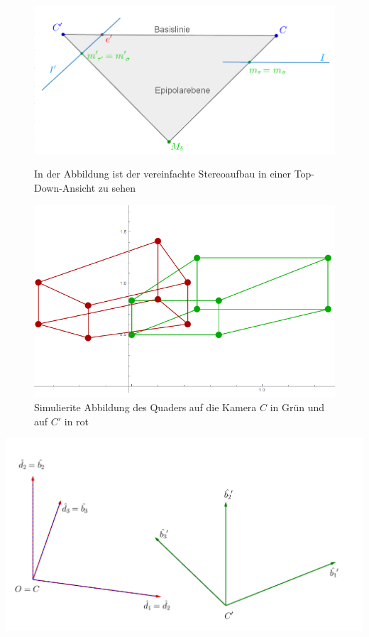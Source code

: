 \begin{figure}[!htb]
	\includegraphics[width=\linewidth]{images/SynthetischesBeispielAufbauTopDown_beschriftet.png}
	\caption[Synthetisches Beispiel Top-Down-Ansicht]{In der Abbildung ist der vereinfachte Stereoaufbau in einer Top-Down-Ansicht zu sehen}
	\label{fig:aufbauMinimalTopDown}
	\endminipage\hfill
	\includegraphics[width=\linewidth]{images/QuadrateMinimalBeispiel.png}
	\caption[Simulierte Abbildung eines Quaders auf zwei Kameras]{Simulierite Abbildung des Quaders auf die Kamera $C$ in Grün und auf $C'$ in rot}
	\label{fig:AbbildungenMinimal}
	\endminipage\hfill
\end{figure}

\begin{minipage}{\linewidth}
	\centering
	\includegraphics[width=.6\linewidth]{images/KS_Minimalbeispiel_beschriftet.png}
	\label{fig:KoordsystemeMinimal}
\end{minipage}\\ \\


